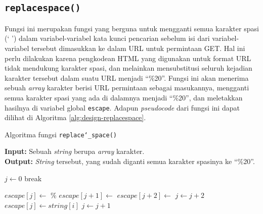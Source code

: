 \subsection{\texttt{replace\textunderscore space()}}
\label{sec:design-code-replacespace}

Fungsi ini merupakan fungsi yang berguna untuk mengganti semua karakter spasi (` ') dalam variabel-variabel kata kunci pencarian sebelum isi dari variabel-variabel tersebut dimasukkan ke dalam URL untuk permintaan GET. Hal ini perlu dilakukan karena pengkodean HTML yang digunakan untuk format URL tidak mendukung karakter spasi, dan melainkan mensubstitusi seluruh kejadian karakter tersebut dalam suatu URL menjadi ``\%20''. Fungsi ini akan menerima sebuah \textit{array} karakter berisi URL permintaan sebagai masukannya, mengganti semua karakter spasi yang ada di dalamnya menjadi ``\%20'', dan meletakkan hasilnya di variabel global \verb|escape|. Adapun \textit{pseudocode} dari fungsi ini dapat dilihat di Algoritma \ref{alg:design-replacespace}.

\begin{algorithm}[h]
	\caption{\textendash\xspace Algoritma fungsi \texttt{replace\char`_space()}}
	\label{alg:design-replacespace}
	\vspace{-0.6\baselineskip}
	\begin{flushleft}
        \textbf{Input:} Sebuah \textit{string} berupa \textit{array} karakter. \\
        \textbf{Output:} \textit{String} tersebut, yang sudah diganti semua karakter spasinya ke ``\%20''. \\
	\end{flushleft}
	\vspace{-1.05\baselineskip}
	\begin{algorithmic}
		\State $j \gets 0$
		 
			 
			    \State break 
			\EndIf
		
			\If{$string[i]$ == \textquotesingle\xspace\textquotesingle}
			    \State $escape[j] \gets$ \textquotesingle\%\textquotesingle
			    \State $escape[j + 1] \gets$ \textquotesingle
			    \State $escape[j + 2] \gets$ \textquotesingle
			    \State $j \gets j + 2$ 
			\Else
				\State $escape[j] \gets string[i]$ 
			\EndIf
			\State $j \gets j + 1$
		\EndFor
		
		\State {}
	\end{algorithmic}
\end{algorithm}
\vspace*{-1em} %
